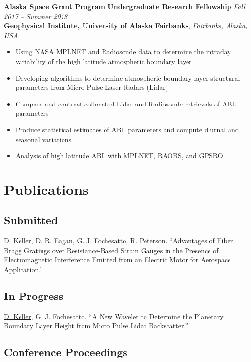 \documentclass[12pt,a4paper]{article}
\begin{document}
\textbf{Alaska Space Grant Program Undergraduate Research Fellowship} \textit{Fall 2017 – Summer 2018}\\
\textbf{Geophysical Institute, University of Alaska Fairbanks}, \textit{Fairbanks, Alaska, USA}
\begin{itemize}
\item Using NASA MPLNET and Radiosonde data to determine the intraday variability of the high
latitude atmospheric boundary layer
\item Developing algorithms to determine atmospheric boundary layer structural parameters from Micro Pulse Laser Radars (Lidar)
\item Compare and contrast collocated Lidar and Radiosonde retrievals of ABL parameters
\item Produce statistical estimates of ABL parameters and compute diurnal and seasonal
variations
\item Analysis of high latitude ABL with MPLNET, RAOBS, and GPSRO
\end{itemize}

\section*{Publications}

\subsection*{Submitted}

\begin{hangparas}{20pt}{1}
\underline{D. Keller}, D. R. Eagan, G. J. Fochesatto, R. Peterson. “Advantages of Fiber Bragg Gratings over
Resistance-Based Strain Gauges in the Presence of Electromagnetic Interference Emitted from
an Electric Motor for Aerospace Application.”
\end{hangparas}

\subsection*{In Progress}

\begin{hangparas}{20pt}{1}
\underline{D. Keller}, G. J. Fochesatto. “A New Wavelet to Determine the Planetary Boundary Layer Height
from Micro Pulse Lidar Backscatter.”
\end{hangparas}

\subsection*{Conference Proceedings}
\end{document}
